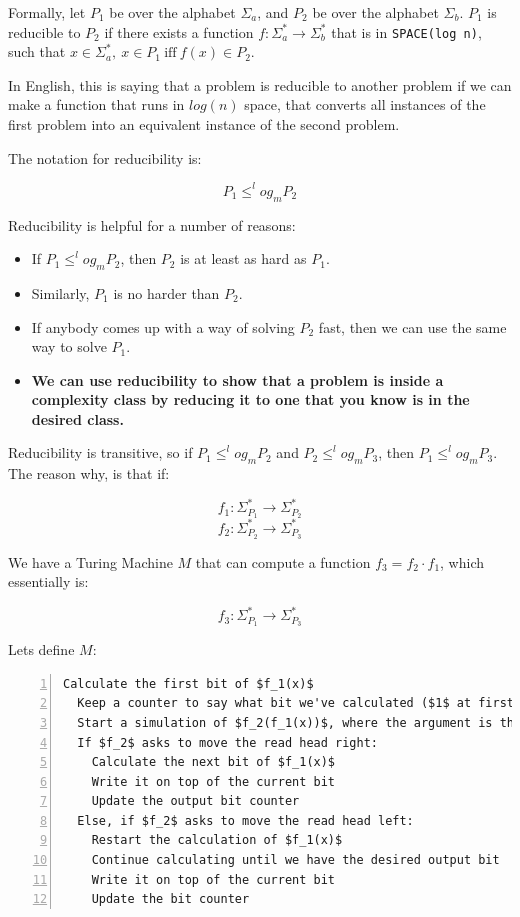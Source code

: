 Formally, let $P_1$ be over the alphabet $\Sigma_a$, and $P_2$ be over the
alphabet $\Sigma_b$. $P_1$ is reducible to $P_2$ if there exists a function $f :
\Sigma^*_a \rightarrow \Sigma^*_b$ that is in \texttt{SPACE(log n)}, such that
$x \in \Sigma^*_a,~x \in P_1~\text{iff}~f(x)\in P_2$.

In English, this is saying that a problem is reducible to another problem if we
can make a function that runs in $log(n)$ space, that converts all instances of
the first problem into an equivalent instance of the second problem.

The notation for reducibility is:



\[
  P_1 \leq^log_m P_2
\]

Reducibility is helpful for a number of reasons:

\begin{itemize}
  \item If $P_1 \leq^log_m P_2$, then $P_2$ is at least as hard as $P_1$.
  \item Similarly, $P_1$ is no harder than $P_2$.
  \item If anybody comes up with a way of solving $P_2$ fast, then we can use 
    the same way to solve $P_1$.
  \item \textbf{We can use reducibility to show that a problem is inside a 
    complexity class by reducing it to one that you know is in the desired
    class.}
\end{itemize}

Reducibility is transitive, so if $P_1 \leq^log_m P_2$ and $P_2 \leq^log_m P_3$, then $P_1 \leq^log_m P_3$. The reason why, is that if:

\[
  f_1 : \Sigma^*_{P_1} \rightarrow \Sigma^*_{P_2}
\]
\[
  f_2 : \Sigma^*_{P_2} \rightarrow \Sigma^*_{P_3}
\]

We have a Turing Machine $M$ that can compute a function $f_3 = f_2 \cdot f_1$,
which essentially is:

\[
  f_3 : \Sigma^*_{P_1} \rightarrow \Sigma^*_{P_3}
\]

Lets define $M$:

\begin{lstlisting}[numbers=left,mathescape]
  Calculate the first bit of $f_1(x)$
  Keep a counter to say what bit we've calculated ($1$ at first)
  Start a simulation of $f_2(f_1(x))$, where the argument is the calculated bit
  If $f_2$ asks to move the read head right:
    Calculate the next bit of $f_1(x)$
    Write it on top of the current bit
    Update the output bit counter
  Else, if $f_2$ asks to move the read head left:
    Restart the calculation of $f_1(x)$
    Continue calculating until we have the desired output bit
    Write it on top of the current bit
    Update the bit counter
\end{lstlisting}

